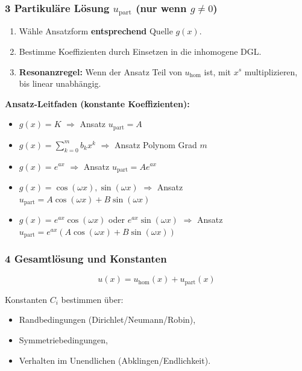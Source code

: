\documentclass[a4paper]{article}
\newcommand{\imp}[1]{{\color{accent}\bfseries #1}}
\begin{document}
\subsubsection{3 Partikuläre Lösung $u_{\text{part}}$ (nur wenn $g\neq 0$)}
\begin{vorgehen}
\begin{enumerate}
  \item Wähle Ansatzform \imp{entsprechend} Quelle $g(x)$.
  \item Bestimme Koeffizienten durch Einsetzen in die inhomogene DGL.
  \item \imp{Resonanzregel:} Wenn der Ansatz Teil von $u_{\text{hom}}$ ist, mit $x^s$ multiplizieren, bis linear unabhängig.
\end{enumerate}
\end{vorgehen}

\begin{schema}
\imp{Ansatz-Leitfaden (konstante Koeffizienten):}
\begin{itemize}
  \item $g(x)=K$ \;\;\;$\Rightarrow$ Ansatz $u_{\text{part}}=A$
  \item $g(x)=\sum_{k=0}^m b_k x^k$ \;\;\;$\Rightarrow$ Ansatz Polynom Grad $m$
  \item $g(x)=e^{ax}$ \;\;\;$\Rightarrow$ Ansatz $u_{\text{part}}=A e^{ax}$
  \item $g(x)=\cos(\omega x),\sin(\omega x)$ \;\;\;$\Rightarrow$ Ansatz $u_{\text{part}}=A\cos(\omega x)+B\sin(\omega x)$
  \item $g(x)=e^{ax}\cos(\omega x)$ oder $e^{ax}\sin(\omega x)$ \;\;\;$\Rightarrow$ Ansatz $u_{\text{part}}=e^{ax}(A\cos(\omega x)+B\sin(\omega x))$
\end{itemize}
\end{schema}

\subsubsection{4 Gesamtlösung und Konstanten}
\begin{schema}
\[
u(x) = u_{\text{hom}}(x) + u_{\text{part}}(x)
\]
\end{schema}

\begin{vorgehen}
Konstanten $C_i$ bestimmen über:
\begin{itemize}
  \item Randbedingungen (Dirichlet/Neumann/Robin),
  \item Symmetriebedingungen,
  \item Verhalten im Unendlichen (Abklingen/Endlichkeit).
\end{itemize}
\end{vorgehen}
\end{document}
